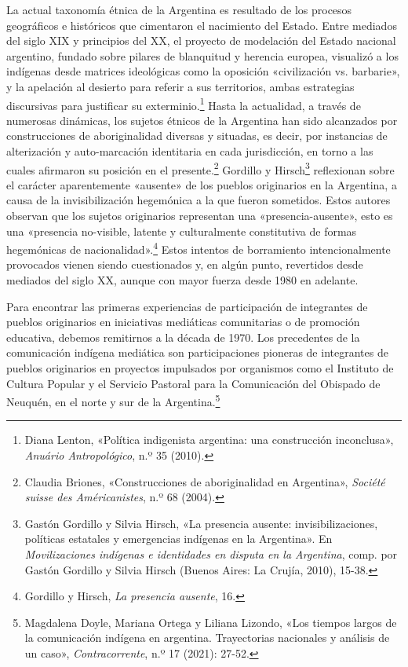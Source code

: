 \documentclass{tufte-handout}
\begin{document}
La actual taxonomía étnica de la Argentina es resultado de los procesos
geográficos e históricos que cimentaron el nacimiento del Estado. Entre
mediados del siglo XIX y principios del XX, el proyecto de modelación
del Estado nacional argentino, fundado sobre pilares de blanquitud y
herencia europea, visualizó a los indígenas desde matrices ideológicas
como la oposición «civilización vs. barbarie», y la apelación al
desierto para referir a sus territorios, ambas estrategias discursivas
para justificar su exterminio.\footnote{Diana Lenton, «Política
  indigenista argentina: una construcción inconclusa», \emph{Anuário
  Antropológico}, n.º 35 (2010).} Hasta la actualidad, a través de
numerosas dinámicas, los sujetos étnicos de la Argentina han sido
alcanzados por construcciones de aboriginalidad diversas y situadas, es
decir, por instancias de alterización y auto-marcación identitaria en
cada jurisdicción, en torno a las cuales afirmaron su posición en el
presente.\footnote{Claudia Briones, «Construcciones de aboriginalidad en
  Argentina», \emph{Société suisse des Américanistes}, n.º 68 (2004).}
Gordillo y Hirsch\footnote{Gastón Gordillo y Silvia Hirsch, «La
  presencia ausente: invisibilizaciones, políticas estatales y
  emergencias indígenas en la Argentina». En \emph{Movilizaciones
  indígenas e identidades en disputa en la Argentina}, comp. por Gastón
  Gordillo y Silvia Hirsch (Buenos Aires: La Crujía, 2010), 15-38.}
reflexionan sobre el carácter aparentemente «ausente» de los pueblos
originarios en la Argentina, a causa de la invisibilización hegemónica a
la que fueron sometidos. Estos autores observan que los sujetos
originarios representan una «presencia-ausente», esto es una «presencia
no-visible, latente y culturalmente constitutiva de formas hegemónicas
de nacionalidad».\footnote{Gordillo y Hirsch, \emph{La presencia
  ausente}, 16.} Estos intentos de borramiento intencionalmente
provocados vienen siendo cuestionados y, en algún punto, revertidos
desde mediados del siglo XX, aunque con mayor fuerza desde 1980 en
adelante.

Para encontrar las primeras experiencias de participación de integrantes
de pueblos originarios en iniciativas mediáticas comunitarias o de
promoción educativa, debemos remitirnos a la década de 1970. Los
precedentes de la comunicación indígena mediática son participaciones
pioneras de integrantes de pueblos originarios en proyectos impulsados
por organismos como el Instituto de Cultura Popular y el Servicio
Pastoral para la Comunicación del Obispado de Neuquén, en el norte y sur
de la Argentina.\footnote{Magdalena Doyle, Mariana Ortega y Liliana
  Lizondo, «Los tiempos largos de la comunicación indígena en argentina.
  Trayectorias nacionales y análisis de un caso», \emph{Contracorrente},
  n.º 17 (2021): 27-52.}
\end{document}
